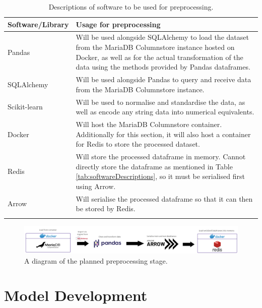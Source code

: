 \documentclass[12pt]{report}
\begin{document}
\begin{longtable}{ |p{}| p{}|}
    \hline
    \cellcolor{blue!25}Software/Library & \cellcolor{blue!25}Usage for preprocessing\\
    \hline
    Pandas & 
    Will be used alongside SQLAlchemy to load the dataset from the MariaDB Columnstore instance hosted on Docker, 
    as well as for the actual transformation of the data using the methods provided by Pandas dataframes.\\
    \hline
    SQLAlchemy & 
    Will be used alongside Pandas to query and receive data from the MariaDB Columnstore instance.\\
    \hline
    Scikit-learn & 
    Will be used to normalise and standardise the data, as well as encode any string data into numerical 
    equivalents.\\
    \hline
    Docker &
    Will host the MariaDB Columnstore container. Additionally for this section, it will also host a 
    container for Redis to store the processed dataset.\\
    \hline
    Redis &
    Will store the processed dataframe in memory. Cannot directly store the dataframe as mentioned in 
    Table \ref{tab:softwareDescriptions}, so it must be serialised first using Arrow.\\
    \hline
    Arrow & 
    Will serialise the processed dataframe so that it can then be stored by Redis.\\
    \hline
\caption{Descriptions of software to be used for preprocessing.}\label{tab:PreprocessingSoftware}
\end{longtable}

\begin{figure}[H]
    \centering
    \includegraphics[width=.9\linewidth]{diagrams/Preprocessing.png}
    \caption{A diagram of the planned preprocessing stage.}
    \label{fig:PreprocessingDiagram}
\end{figure}



\section{Model Development}\label{sec:Development}
\end{document}
